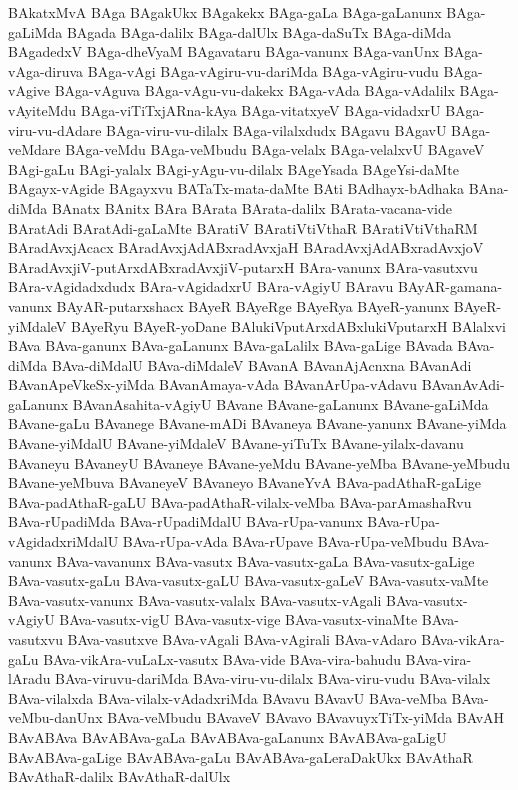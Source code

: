 {BAkatxMvA
BAga
BAgakUkx
BAgakekx
BAga-gaLa
BAga-gaLanunx
BAga-gaLiMda
BAgada
BAga-dalilx
BAga-dalUlx
BAga-daSuTx
BAga-diMda
BAgadedxV
BAga-dheVyaM
BAgavataru
BAga-vanunx
BAga-vanUnx
BAga-vAga-diruva
BAga-vAgi
BAga-vAgiru-vu-dariMda
BAga-vAgiru-vudu
BAga-vAgive
BAga-vAguva
BAga-vAgu-vu-dakekx
BAga-vAda
BAga-vAdalilx
BAga-vAyiteMdu
BAga-viTiTxjARna-kAya
BAga-vitatxyeV
BAga-vidadxrU
BAga-viru-vu-dAdare
BAga-viru-vu-dilalx
BAga-vilalxdudx
BAgavu
BAgavU
BAga-veMdare
BAga-veMdu
BAga-veMbudu
BAga-velalx
BAga-velalxvU
BAgaveV
BAgi-gaLu
BAgi-yalalx
BAgi-yAgu-vu-dilalx
BAgeYsada
BAgeYsi-daMte
BAgayx-vAgide
BAgayxvu
BATaTx-mata-daMte
BAti
BAdhayx-bAdhaka
BAna-diMda
BAnatx
BAnitx
BAra
BArata
BArata-dalilx
BArata-vacana-vide
BAratAdi
BAratAdi-gaLaMte
BAratiV
BAratiVtiVthaR
BAratiVtiVthaRM
BAradAvxjAcacx
BAradAvxjAdABxradAvxjaH
BAradAvxjAdABxradAvxjoV
BAradAvxjiV-putArxdABxradAvxjiV-putarxH
BAra-vanunx
BAra-vasutxvu
BAra-vAgidadxdudx
BAra-vAgidadxrU
BAra-vAgiyU
BAravu
BAyAR-gamana-vanunx
BAyAR-putarxshacx
BAyeR
BAyeRge
BAyeRya
BAyeR-yanunx
BAyeR-yiMdaleV
BAyeRyu
BAyeR-yoDane
BAlukiVputArxdABxlukiVputarxH
BAlalxvi
BAva
BAva-ganunx
BAva-gaLanunx
BAva-gaLalilx
BAva-gaLige
BAvada
BAva-diMda
BAva-diMdalU
BAva-diMdaleV
BAvanA
BAvanAjAcnxna
BAvanAdi
BAvanApeVkeSx-yiMda
BAvanAmaya-vAda
BAvanArUpa-vAdavu
BAvanAvAdi-gaLanunx
BAvanAsahita-vAgiyU
BAvane
BAvane-gaLanunx
BAvane-gaLiMda
BAvane-gaLu
BAvanege
BAvane-mADi
BAvaneya
BAvane-yanunx
BAvane-yiMda
BAvane-yiMdalU
BAvane-yiMdaleV
BAvane-yiTuTx
BAvane-yilalx-davanu
BAvaneyu
BAvaneyU
BAvaneye
BAvane-yeMdu
BAvane-yeMba
BAvane-yeMbudu
BAvane-yeMbuva
BAvaneyeV
BAvaneyo
BAvaneYvA
BAva-padAthaR-gaLige
BAva-padAthaR-gaLU
BAva-padAthaR-vilalx-veMba
BAva-parAmashaRvu
BAva-rUpadiMda
BAva-rUpadiMdalU
BAva-rUpa-vanunx
BAva-rUpa-vAgidadxriMdalU
BAva-rUpa-vAda
BAva-rUpave
BAva-rUpa-veMbudu
BAva-vanunx
BAva-vavanunx
BAva-vasutx
BAva-vasutx-gaLa
BAva-vasutx-gaLige
BAva-vasutx-gaLu
BAva-vasutx-gaLU
BAva-vasutx-gaLeV
BAva-vasutx-vaMte
BAva-vasutx-vanunx
BAva-vasutx-valalx
BAva-vasutx-vAgali
BAva-vasutx-vAgiyU
BAva-vasutx-vigU
BAva-vasutx-vige
BAva-vasutx-vinaMte
BAva-vasutxvu
BAva-vasutxve
BAva-vAgali
BAva-vAgirali
BAva-vAdaro
BAva-vikAra-gaLu
BAva-vikAra-vuLaLx-vasutx
BAva-vide
BAva-vira-bahudu
BAva-vira-lAradu
BAva-viruvu-dariMda
BAva-viru-vu-dilalx
BAva-viru-vudu
BAva-vilalx
BAva-vilalxda
BAva-vilalx-vAdadxriMda
BAvavu
BAvavU
BAva-veMba
BAva-veMbu-danUnx
BAva-veMbudu
BAvaveV
BAvavo
BAvavuyxTiTx-yiMda
BAvAH
BAvABAva
BAvABAva-gaLa
BAvABAva-gaLanunx
BAvABAva-gaLigU
BAvABAva-gaLige
BAvABAva-gaLu
BAvABAva-gaLeraDakUkx
BAvAthaR
BAvAthaR-dalilx
BAvAthaR-dalUlx
}
